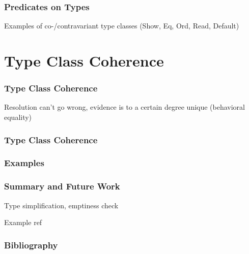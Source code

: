 \documentclass{beamer}
\begin{document}
\begin{frame}
    \frametitle{Predicates on Types}
    Examples of co-/contravariant type classes (Show, Eq, Ord, Read, Default)
\end{frame}

\section{Type Class Coherence}

\begin{frame}
    \frametitle{Type Class Coherence}

    Resolution can't go wrong, evidence is to a certain degree unique (behavioral equality)
\end{frame}

\begin{frame}
  \frametitle{Type Class Coherence}


\end{frame}

\begin{frame}
    \frametitle{Examples}
\end{frame}

\begin{frame}
    \frametitle{Summary and Future Work}
    Type simplification, emptiness check

    Example ref
    \cite{kiselyov}
\end{frame}

\begin{frame}
    \frametitle{Bibliography}
    
    
\end{frame}
\end{document}
